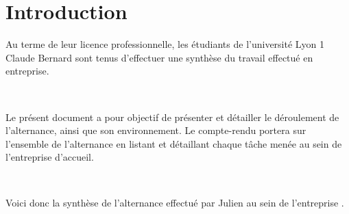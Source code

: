 \chapter*{Introduction}
Au terme de leur licence professionnelle, les étudiants de l'université Lyon 1 Claude Bernard sont tenus d'effectuer une synthèse du travail effectué en entreprise.

~

Le présent document a pour objectif de présenter et détailler le déroulement de l'alternance, ainsi que son environnement. Le compte-rendu portera sur l'ensemble de l'alternance en listant et détaillant chaque tâche menée au sein de l'entreprise d'accueil.

~

Voici donc la synthèse de l'alternance effectué par Julien  au sein de l'entreprise \solulog{}.